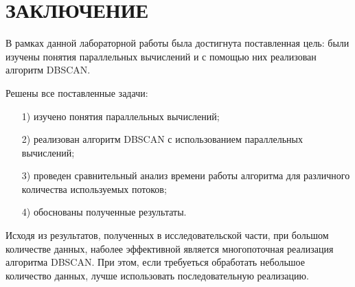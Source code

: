 {\centering \chapter*{ЗАКЛЮЧЕНИЕ}}

В рамках данной лабораторной работы была достигнута поставленная цель: были изучены понятия параллельных вычислений и с помощью них реализован алгоритм DBSCAN.

Решены все поставленные задачи:
\begin{enumerate}
	\item[1)] изучено понятия параллельных вычислений;
	\item[2)] реализован алгоритм DBSCAN с использованием параллельных вычислений;
	\item[3)] проведен сравнительный анализ времени работы алгоритма для различного количества используемых потоков;
	\item[4)] обоснованы полученные результаты.
\end{enumerate}

Исходя из результатов, полученных в исследовательской части, при большом количестве данных, наболее эффективной является многопоточная реализация алгоритма DBSCAN.
При этом, если требуеться обработать небольшое количество данных, лучше использовать последовательную реализацию.
